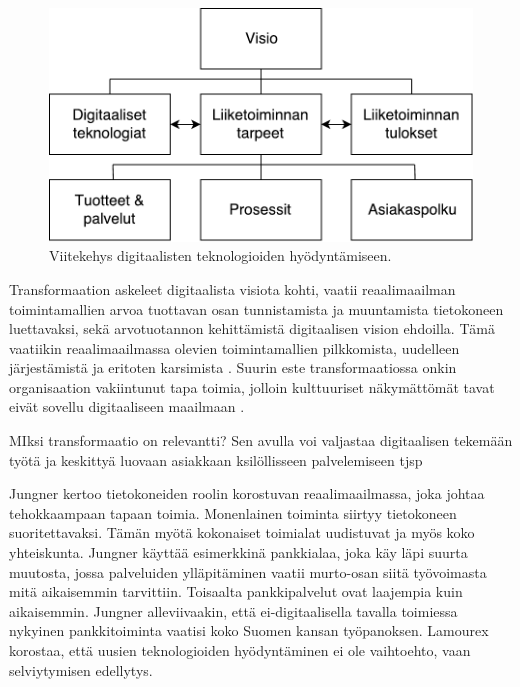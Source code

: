 \documentclass[finnish,12pt,a4paper,pdftex]{article}
\begin{document}
\begin{figure}[!h]
    \centering
    \includegraphics[scale=0.6]{images/digitaalinenvisio.pdf}
    \caption{Viitekehys digitaalisten teknologioiden hyödyntämiseen. \citep{lamoureux}}
    \label{fig:digivisio}
\end{figure}

Transformaation askeleet digitaalista visiota kohti, vaatii reaalimaailman toimintamallien arvoa tuottavan osan tunnistamista ja muuntamista tietokoneen luettavaksi, sekä arvotuotannon kehittämistä digitaalisen vision ehdoilla. Tämä vaatiikin reaalimaailmassa olevien toimintamallien pilkkomista, uudelleen järjestämistä ja eritoten karsimista \citep{leanit}. Suurin este transformaatiossa onkin organisaation vakiintunut tapa toimia, jolloin kulttuuriset näkymättömät tavat eivät sovellu digitaaliseen maailmaan \citep{jungner, lamoureux}.

MIksi transformaatio on relevantti? Sen avulla voi valjastaa digitaalisen tekemään työtä ja keskittyä luovaan asiakkaan ksilöllisseen palvelemiseen tjsp

Jungner \citeyearpar{jungner} kertoo tietokoneiden roolin korostuvan reaalimaailmassa, joka johtaa tehokkaampaan tapaan toimia. Monenlainen toiminta siirtyy tietokoneen suoritettavaksi. Tämän myötä kokonaiset toimialat uudistuvat ja myös koko yhteiskunta. Jungner käyttää esimerkkinä pankkialaa, joka käy läpi suurta muutosta, jossa palveluiden ylläpitäminen vaatii murto-osan siitä työvoimasta mitä aikaisemmin tarvittiin. Toisaalta pankkipalvelut ovat laajempia kuin aikaisemmin. Jungner alleviivaakin, että ei-digitaalisella tavalla toimiessa nykyinen pankkitoiminta vaatisi koko Suomen kansan työpanoksen. Lamourex \citeyearpar{lamoureux} korostaa, että
uusien teknologioiden hyödyntäminen ei ole vaihtoehto, vaan selviytymisen edellytys.
\end{document}
